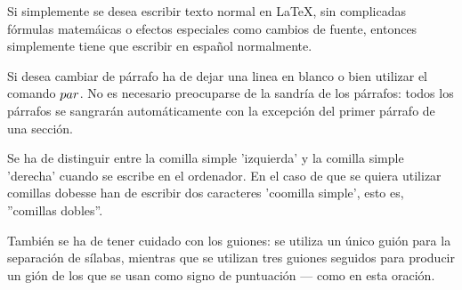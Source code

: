 \documentclass[a4paper, 10pt]{letter}
\begin{document}
Si simplemente se desea escribir texto normal en LaTeX,
sin complicadas f\'ormulas matem\'aicas o efectos especiales
como cambios de fuente, entonces simplemente tiene que escribir
en espa\~nol normalmente. \par
Si desea cambiar de párrafo ha de dejar una linea en blanco o bien
utilizar el comando $\\par$.
No es necesario preocuparse de la sandría de los párrafos:
todos los párrafos se sangrarán automáticamente con la excepción
del primer párrafo de una sección.


Se ha de distinguir entre la comilla simple 'izquierda'
y la comilla simple 'derecha' cuando se escribe en el ordenador.
En el caso de que se quiera utilizar comillas dobesse han de escribir
dos caracteres 'coomilla simple', esto es, 
''comillas dobles''.


También se ha de tener cuidado con los guiones: se utiliza un único
guión para la separación de sílabas, mientras que se utilizan 
tres guiones seguidos para producir un gión de los que se usan 
como signo de puntuación --- como en esta oración.
\end{document}
